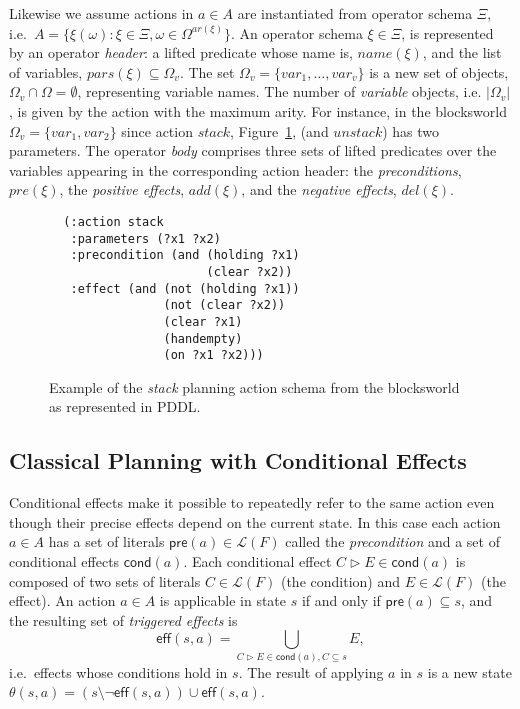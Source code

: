 \documentclass[letterpaper]{article} %
\newcommand{\pre}{\mathsf{pre}}     %
\newcommand{\eff}{\mathsf{eff}}     %
\newcommand{\cond}{\mathsf{cond}}   %
\begin{document}
Likewise we assume actions in $a\in A$ are instantiated from operator schema $\Xi$, i.e.~$A=\{\xi(\omega):\xi\in\Xi,\omega\in\Omega^{ar(\xi)}\}$. An operator schema $\xi\in \Xi$, is represented by an operator {\em header}: a lifted predicate whose name is, $name(\xi)$, and the list of variables, $pars(\xi)\subseteq\Omega_v$. The set $\Omega_v=\{var_1,\ldots,var_v\}$ is a new set of objects, $\Omega_v\cap\Omega=\emptyset$, representing variable names. The number of {\em variable} objects, i.e. $|\Omega_v|$, is given by the action with the maximum arity. For instance, in the blocksworld $\Omega_v=\{var_1,var_2\}$ since action $stack$, Figure~\ref{fig:stack}, (and $unstack$) has two parameters. The operator {\em body} comprises three sets of lifted predicates over the variables appearing in the corresponding action header: the {\em preconditions}, $pre(\xi)$, the {\em positive effects}, $add(\xi)$, and the {\em negative effects}, $del(\xi)$.  

\begin{figure}[hbt]
\begin{footnotesize}
\begin{verbatim}
  (:action stack
   :parameters (?x1 ?x2)
   :precondition (and (holding ?x1) 
                      (clear ?x2))
   :effect (and (not (holding ?x1))
                (not (clear ?x2))
                (clear ?x1)
                (handempty)
                (on ?x1 ?x2)))
\end{verbatim}
\end{footnotesize}
 \caption{\small Example of the {\em stack} planning action schema from the blocksworld as represented in PDDL.}
\label{fig:stack}
\end{figure}


\subsection{Classical Planning with Conditional Effects}
Conditional effects make it possible to repeatedly refer to the same action even though their precise effects depend on the current state. In this case each action $a\in A$ has a set of literals $\pre(a)\in\mathcal{L}(F)$ called the {\em precondition} and a set of conditional effects $\cond(a)$. Each conditional effect $C\rhd E\in\cond(a)$ is composed of two sets of literals $C\in\mathcal{L}(F)$ (the condition) and $E\in\mathcal{L}(F)$ (the effect). An action $a\in A$ is applicable in state $s$ if and only if $\pre(a)\subseteq s$, and the resulting set of {\em triggered effects} is
\[
\eff(s,a)=\bigcup_{C\rhd E\in\cond(a),C\subseteq s} E,
\]
i.e.~effects whose conditions hold in $s$. The result of applying $a$ in $s$ is a new state $\theta(s,a)=(s\setminus \neg\eff(s,a))\cup\eff(s,a)$.
\end{document}
